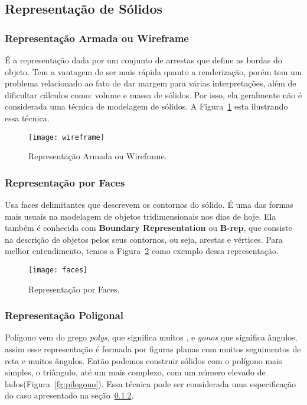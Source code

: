 \subsection{Representação de Sólidos}
\subsubsection{Representação Armada ou Wireframe}
É a representação dada por um conjunto de arrestas que define as bordas do objeto\cite{speck}. Tem a vantagem de ser mais rápida quanto a renderização, porém tem um problema relacionado ao fato de dar margem para várias interpretações, além de dificultar cálculos como: volume e massa de sólidos. Por isso, ela geralmente não é considerada uma técnica de modelagem de sólidos. A Figura~\ref{fg:wireframe} esta ilustrando essa técnica.

\begin{figure}[ht!]
	\centering
	\texttt{[image: wireframe]}
	\caption{Representação Armada ou Wireframe.}
	\label{fg:wireframe}
\end{figure} 

\subsubsection{Representação por Faces} 
\label{sec:r_faces}
Usa faces delimitantes que descrevem os contornos do sólido. É uma das formas mais usuais na modelagem de objetos tridimensionais nos dias de hoje. Ela  também é conhecida com  \textbf{Boundary Representation} ou \textbf{B-rep}, que consiste na descrição de  objetos pelos seus contornos, ou seja, arestas e vértices. Para melhor entendimento, temos a Figura~\ref{fg:faces} como exemplo dessa representação.

\begin{figure}[ht!]
      \centering
	  \texttt{[image: faces]}
	  \caption{Representação por Faces.}
	  \label{fg:faces}
\end{figure} 

\subsubsection{Representação Poligonal}
Polígono vem do grego \textit{polys}, que significa muitos , e \textit{gonos} que significa ângulos, assim esse representação é formada por figuras planas com muitos seguimentos de reta e muitos ângulos. Então podemos construir sólidos com o polígono mais  simples, o triângulo, até um mais complexo, com um número elevado de lados(Figura~\ref{fg:pilogono}). Essa técnica pode ser considerada uma especificação do caso apresentado na seção~\ref{sec:r_faces}.\\

